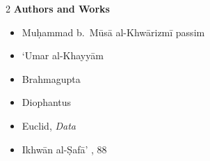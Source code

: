 \documentclass[10pt,a4paper]{article}
\begin{document}
\begin{paracol}{2}
\textbf{Authors and Works}
\begin{itemize}[noitemsep]
\item Mu\d{h}ammad b.\ M\=us\=a al-Khw\=arizm\={i} \dotfill passim
\item `Umar al-Khayy\=am 
\item Brahmagupta 
\item Diophantus 
\item Euclid, \textit{Data} 
\item Ikhw\=an al-\d{S}af\=a' , 88
\end{itemize}
\end{paracol}
\end{document}
